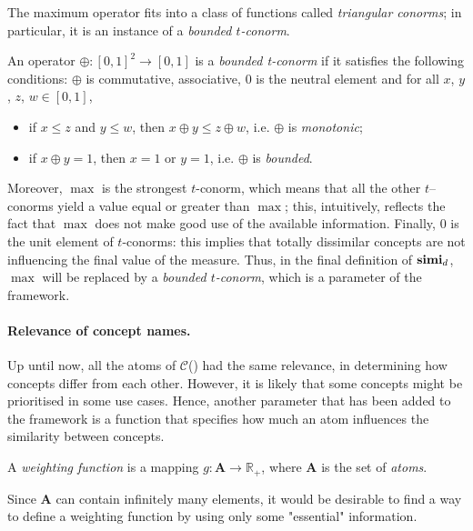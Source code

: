   The maximum operator fits into a class of functions called \emph{triangular conorms}; %
  in particular, it is an instance of a \emph{bounded \(t\)-conorm}.
  \begin{definition}%
    An operator \(\oplus \colon {[0,1]}^2 \to [0,1]\) is a \emph{bounded t-conorm} if it satisfies the following conditions: \(\oplus\) is commutative, associative, \(0\) is the neutral element and for all \(x\), \(y\), \(z\), \(w \in [0,1]\),
    \begin{itemize}
      \item if \(x \le z\) and \(y \le w\), then \(x \oplus y \le z \oplus w\), i.e. \(\oplus{}\) is \emph{monotonic};
      \item if \(x \oplus y = 1\), then \(x = 1\) or \(y = 1\), i.e. \(\oplus{}\) is \emph{bounded}.
    \end{itemize}
  \end{definition}
  Moreover, \(\max\) is the strongest \(t\)-conorm, which means that all the other \(t\)--conorms yield a value equal or greater than \(\max\); this, intuitively, reflects the fact that \(\max\) does not make good use of the available information.
  Finally, \(0\) is the unit element of \(t\)-conorms: this implies that totally dissimilar concepts are not influencing the final value of the measure.
  Thus, in the final definition of \(\operatorname{\mathbf{simi}}_d\), \(\max\) will be replaced by a \emph{bounded \(t\)-conorm}, which is a parameter of the framework.

  \paragraph{Relevance of concept names.}
  Up until now, all the atoms of \(\mathcal{C}\)(\elh) had the same relevance, in determining how concepts differ from each other.
  However, it is likely that some concepts might be prioritised in some use cases.
  Hence, another parameter that has been added to the framework is a function that specifies how much an atom influences the similarity between concepts.
  \begin{definition}%
    A \emph{weighting function} is a mapping \(g \colon \mathbf{A} \to \mathbb{R}_+\), where \(\mathbf{A}\) is the set of \emph{atoms}.
  \end{definition}

  Since \(\mathbf{A}\) can contain infinitely many elements, it would be desirable to find a way to define a weighting function by using only some "essential" information.


